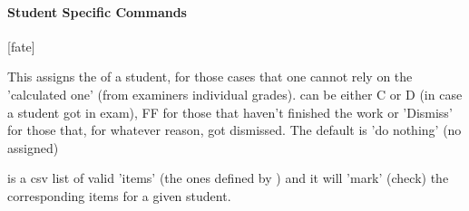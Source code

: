 \documentclass[article,nogeometry,english,tocdepth=3,secdepth=3]{ufrgscca} %
\begin{document}

\paragraph{Student Specific Commands}\label{student-specific-commands}
\begin{codedescribe}[code,update=2023/11/18]{\studentfate}
	\begin{codesyntax}%
		\tsmacro{\studentfate}[fate]{}
	\end{codesyntax}
This assigns the  of a student, for those cases that one cannot rely on the 'calculated one' (from examiners individual grades).  can be either C or D (in case a student got in exam), FF for those that haven't finished the work or 'Dismiss' for those that, for whatever reason, got dismissed. The default is 'do nothing' (no  assigned)
\end{codedescribe}

\begin{codedescribe}{\checklist}
    \begin{codesyntax}%
    \end{codesyntax}
     is a csv list of valid 'items' (the ones defined by \tsmacro{\checkdef}{}) and it will 'mark' (check) the corresponding items for a given student.
\end{codedescribe}
\end{document}
